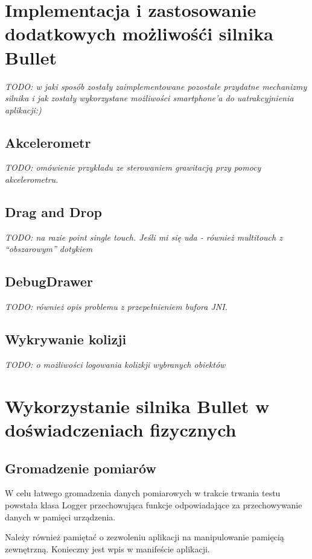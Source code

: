 \newpage
\section{Implementacja i zastosowanie dodatkowych możliwośći silnika Bullet}
\emph{TODO: w jaki sposób zostały zaimplementowane pozostałe przydatne
mechanizmy silnika i jak zostały wykorzystane możliwości smartphone'a do
uatrakcyjnienia aplikacji:)}

\subsection{Akcelerometr}
\emph{TODO: omówienie przykładu ze sterowaniem grawitacją przy pomocy
akcelerometru.}

\subsection{Drag and Drop}
\emph{TODO: na razie point single touch. Jeśli mi się uda - również multitouch
z ``obszarowym'' dotykiem}

\subsection{DebugDrawer}
\emph{TODO: również opis problemu z przepełnieniem bufora JNI.}

\subsection{Wykrywanie kolizji}
\emph{TODO: o możliwości logowania kolizkji wybranych obiektów}

\newpage
\section{Wykorzystanie silnika Bullet w doświadczeniach fizycznych}

\subsection{Gromadzenie pomiarów}

W celu łatwego gromadzenia danych pomiarowych w trakcie trwania testu powstała
klasa Logger przechowująca funkcje odpowiadające za przechowywanie danych w
pamięci urządzenia.
  
Należy również pamiętać o zezwoleniu aplikacji na manipulowanie pamięcią
zewnętrzną. Konieczny jest wpis w manifeście aplikacji.


